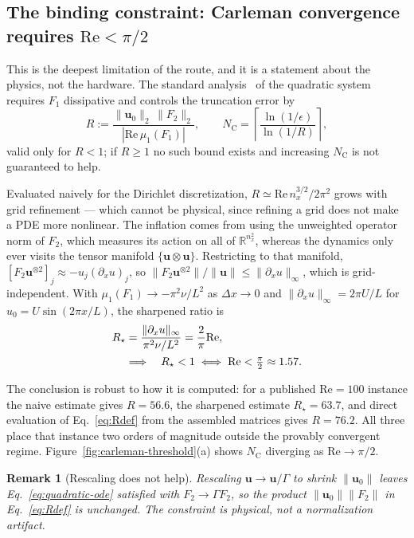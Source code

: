\documentclass[aps,prx,twocolumn,notitlepage,superscriptaddress,floatfix,10pt]{revtex4-2}
\newtheorem{remark}{Remark}
\newcommand{\norm}[1]{\lVert #1 \rVert}
\newcommand{\R}{\mathbb{R}}
\newcommand{\Rey}{\mathrm{Re}}
\newcommand{\NC}{N_{\mathrm{C}}}
\begin{document}
\subsection{The binding constraint: Carleman convergence requires $\Rey<\pi/2$}
\label{sec:carleman-conv}

This is the deepest limitation of the route, and it is a statement about the physics, not the
hardware. The standard analysis~\cite{Liu2021,Forets2017} of the quadratic system requires $F_1$
dissipative and controls the truncation error by
\begin{equation}
R:=\frac{\norm{\bm u_0}_2\,\norm{F_2}_2}{|\mathrm{Re}\,\mu_1(F_1)|},
\qquad
\NC=\left\lceil\frac{\ln(1/\epsilon)}{\ln(1/R)}\right\rceil ,
\label{eq:Rdef}
\end{equation}
valid only for $R<1$; if $R\ge1$ no such bound exists and increasing $\NC$ is not guaranteed to help.

Evaluated naively for the Dirichlet discretization, $R\simeq\Rey\,n_x^{3/2}/2\pi^2$ grows with grid
refinement --- which cannot be physical, since refining a grid does not make a PDE more nonlinear.
The inflation comes from using the unweighted operator norm of $F_2$, which measures its action on all
of $\R^{n_x^2}$, whereas the dynamics only ever visits the tensor manifold
$\{\bm u\otimes\bm u\}$. Restricting to that manifold,
$[F_2\bm u^{\otimes2}]_j\approx-u_j(\partial_xu)_j$, so
$\norm{F_2\bm u^{\otimes2}}/\norm{\bm u}\le\norm{\partial_xu}_\infty$, which is grid-independent.
With $\mu_1(F_1)\to-\pi^2\nu/L^2$ as $\Delta x\to0$ and $\norm{\partial_xu}_\infty=2\pi U/L$ for
$u_0=U\sin(2\pi x/L)$, the sharpened ratio is
\begin{align}
R_\star&=\frac{\norm{\partial_xu}_\infty}{\pi^2\nu/L^2}=\frac{2}{\pi}\Rey,\notag\\
&\Longrightarrow\quad R_\star<1\iff\Rey<\tfrac{\pi}{2}\approx1.57 .
\label{eq:Rstar}
\end{align}

The conclusion is robust to how it is computed: for a published $\Rey=100$ instance the naive
estimate gives $R=56.6$, the sharpened estimate $R_\star=63.7$, and direct evaluation of
Eq.~\eqref{eq:Rdef} from the assembled matrices gives $R=76.2$. All three place that instance two
orders of magnitude outside the provably convergent regime. Figure~\ref{fig:carleman-threshold}(a)
shows $\NC$ diverging as $\Rey\to\pi/2$.

\begin{remark}[Rescaling does not help]
Rescaling $\bm u\to\bm u/\Gamma$ to shrink $\norm{\bm u_0}$ leaves Eq.~\eqref{eq:quadratic-ode}
satisfied with $F_2\to\Gamma F_2$, so the product $\norm{\bm u_0}\norm{F_2}$ in Eq.~\eqref{eq:Rdef}
is unchanged. The constraint is physical, not a normalization artifact.
\end{remark}
\end{document}

